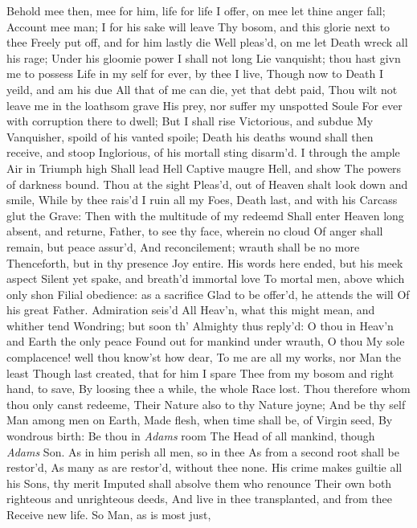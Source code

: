 \documentclass[11pt]{book}
\newcounter {last}
\begin{document}
Behold mee then, mee for him, life for life 
I offer, on mee let thine anger fall; 
Account mee man; I for his sake will leave 
Thy bosom, and this glorie next to thee 
Freely put off, and for him lastly die 
Well pleas'd, on me let Death wreck all his rage; 
Under his gloomie power I shall not long 
Lie vanquisht; thou hast givn me to possess 
Life in my self for ever, by thee I live, 
Though now to Death I yeild, and am his due 
All that of me can die, yet that debt paid, 
Thou wilt not leave me in the loathsom grave 
His prey, nor suffer my unspotted Soule 
For ever with corruption there to dwell; 
But I shall rise Victorious, and subdue 
My Vanquisher, spoild of his vanted spoile; 
Death his deaths wound shall then receive, and stoop 
Inglorious, of his mortall sting disarm'd. 
I through the ample Air in Triumph high 
Shall lead Hell Captive maugre Hell, and show 
The powers of darkness bound.  Thou at the sight 
Pleas'd, out of Heaven shalt look down and smile, 
While by thee rais'd I ruin all my Foes, 
Death last, and with his Carcass glut the Grave: 
Then with the multitude of my redeemd 
Shall enter Heaven long absent, and returne, 
Father, to see thy face, wherein no cloud 
Of anger shall remain, but peace assur'd, 
And reconcilement; wrauth shall be no more 
Thenceforth, but in thy presence Joy entire. 
\quad His words here ended, but his meek aspect 
Silent yet spake, and breath'd immortal love 
To mortal men, above which only shon 
Filial obedience: as a sacrifice 
Glad to be offer'd, he attends the will 
Of his great Father.  Admiration seis'd 
All Heav'n, what this might mean, and whither tend 
Wondring; but soon th' Almighty thus reply'd: 
\quad O thou in Heav'n and Earth the only peace 
Found out for mankind under wrauth, O thou 
My sole complacence! well thou know'st how dear, 
To me are all my works, nor Man the least 
Though last created, that for him I spare 
Thee from my bosom and right hand, to save, 
By loosing thee a while, the whole Race lost. 
Thou therefore whom thou only canst redeeme, 
Their Nature also to thy Nature joyne; 
And be thy self Man among men on Earth, 
Made flesh, when time shall be, of Virgin seed, 
By wondrous birth: Be thou in \textit{Adams} room 
The Head of all mankind, though \textit{Adams} Son. 
As in him perish all men, so in thee 
As from a second root shall be restor'd, 
As many as are restor'd, without thee none. 
His crime makes guiltie all his Sons, thy merit 
Imputed shall absolve them who renounce 
Their own both righteous and unrighteous deeds, 
And live in thee transplanted, and from thee 
Receive new life.  So Man, as is most just, 
\end{document}
